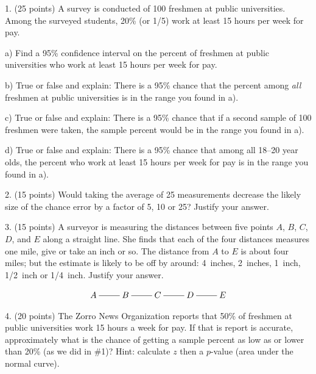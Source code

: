 \documentclass[10pt]{article}
\begin{document}
1. (25 points) A survey is conducted of 100 freshmen at public universities.
Among the surveyed  students, 20\% (or 1/5) work at least 15 hours per week for pay.

\hspace{20pt} a) Find a 95\% confidence interval
on the  percent of freshmen at public universities who work at least 15 hours per week for pay.
\vspace{2.3in}

\hspace{20pt} b) True or false and explain:  There is a 95\% chance that the
percent among \textit{all} freshmen at public universities is in the range you found in a).
\vspace{1.5in}

\hspace{20pt} c) True or false and explain:  There is a 95\% chance that
if a second sample of 100 freshmen were taken,
the sample percent would be in the range you found in a).
\vspace{1.5in}


\hspace{20pt} d) True or false and explain:  There is a 95\% chance that 
 among all 18--20 year olds, the percent who work at least 15 hours per week for pay 
is in the range you found in a).
\vspace{1in}
\vfill
\eject
{\ }



2. (15 points)
Would taking the average of 25 measurements decrease
the likely size of the chance error by a factor of 5, 10 or 25? Justify your answer.
\vspace{1.5in}

3. (15 points) A surveyor is measuring the distances between five points $A$, $B$, $C$,
$D$, and $E$ along a straight line.  She finds that each of the four distances measures one mile, give or take an inch or so.  The distance from $A$ to $E$ is about four miles; 
but the estimate is likely to be off by around:  
4~inches, 2~inches, 1~inch, 1/2~inch or 1/4~inch. Justify your answer.\vspace{-5pt}

\[\xymatrix{
A\ar@{-}[r] & B\ar@{-}[r] & C\ar@{-}[r] & D\ar@{-}[r] & E}\]
\vspace{2in}


4.  (20 points) The Zorro News Organization reports that  50\%
of freshmen at public universities  work 15 hours a week for pay.
If that is report is accurate, approximately what is the chance of getting a sample
percent as low as or lower than 20\% (as we did in \#1)?  Hint:  calculate $z$ then a $p$-value (area under the normal curve).
\vfill
\eject
\end{document}
